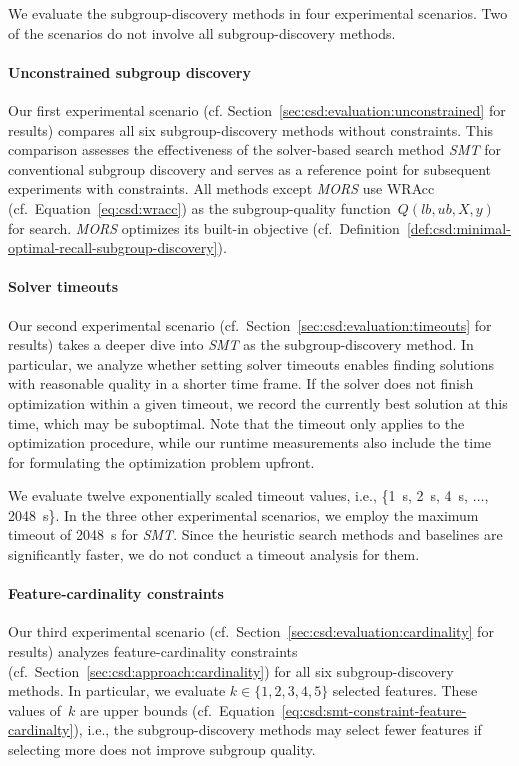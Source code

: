 \documentclass{article}
\theoremstyle{definition}
\begin{document}
We evaluate the subgroup-discovery methods in four experimental scenarios.
Two of the scenarios do not involve all subgroup-discovery methods.

\paragraph{Unconstrained subgroup discovery}

Our first experimental scenario (cf. Section~\ref{sec:csd:evaluation:unconstrained} for results) compares all six subgroup-discovery methods without constraints.
This comparison assesses the effectiveness of the solver-based search method \emph{SMT} for conventional subgroup discovery and serves as a reference point for subsequent experiments with constraints.
All methods except \emph{MORS} use WRAcc (cf.~Equation~\ref{eq:csd:wracc}) as the subgroup-quality function~$Q(\mathit{lb}, \mathit{ub}, X, y)$ for search.
\emph{MORS} optimizes its built-in objective (cf.~Definition~\ref{def:csd:minimal-optimal-recall-subgroup-discovery}).

\paragraph{Solver timeouts}

Our second experimental scenario (cf.~Section~\ref{sec:csd:evaluation:timeouts} for results) takes a deeper dive into \emph{SMT} as the subgroup-discovery method.
In particular, we analyze whether setting solver timeouts enables finding solutions with reasonable quality in a shorter time frame.
If the solver does not finish optimization within a given timeout, we record the currently best solution at this time, which may be suboptimal.
Note that the timeout only applies to the optimization procedure, while our runtime measurements also include the time for formulating the optimization problem upfront.

We evaluate twelve exponentially scaled timeout values, i.e., \{1~s, 2~s, 4~s, $\dots$, 2048~s\}.
In the three other experimental scenarios, we employ the maximum timeout of 2048~s for \emph{SMT}.
Since the heuristic search methods and baselines are significantly faster, we do not conduct a timeout analysis for them.

\paragraph{Feature-cardinality constraints}

Our third experimental scenario (cf.~Section~\ref{sec:csd:evaluation:cardinality} for results) analyzes feature-cardinality constraints (cf.~Section~\ref{sec:csd:approach:cardinality}) for all six subgroup-discovery methods.
In particular, we evaluate $k \in \{1, 2, 3, 4, 5\}$ selected features.
These values of~$k$ are upper bounds (cf.~Equation~\ref{eq:csd:smt-constraint-feature-cardinalty}), i.e., the subgroup-discovery methods may select fewer features if selecting more does not improve subgroup quality.
\end{document}
